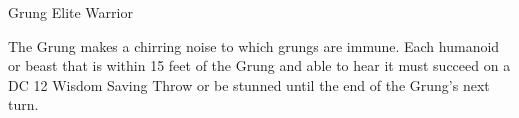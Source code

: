 \begin{DndMonster}[width=0.5\textwidth]{Grung Elite Warrior\label{monster:GrungEliteWarrior}}
	\DndMonsterAttack[
		name			= Shortbow,
		distance		= ranged,	%
		mod				= +5,
		range			= 80/320,
		targets			= one target,
		dmg				= \DndDice{1d6 + 3},
		dmg-type		= Piercing,
		extra			= {, and the target must succeed on a DC 12 Constitution Saving Throw or take \DndDice{2d4} Poison damage},
	]
	
	The Grung makes a chirring noise to which grungs are immune. Each humanoid or beast that is within 15 feet of the Grung and able to hear it must succeed on a DC 12 Wisdom Saving Throw or be stunned until the end of the Grung's next turn.
\end{DndMonster}
